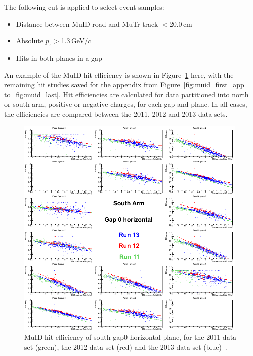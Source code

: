 {\noindent}The following cut is applied to select event samples:
\begin{itemize}
  \item Distance between MuID road and MuTr track $<$20.0\,cm
  \item Absolute $p_{z}$$>$1.3\,GeV/$c$
  \item Hits in both planes in a gap
\end{itemize}

{\noindent}An example of the MuID hit efficiency is shown in
Figure~\ref{fig:muid_first} here, with the remaining hit studies saved for the
appendix from Figure~\ref{fig:muid_first_app} to~\ref{fig:muid_last}. Hit
efficiencies are calculated for data partitioned into north or south arm,
positive or negative charges, for each gap and plane.  In all cases, the
efficiencies are compared between the 2011, 2012 and 2013 data sets.

\begin{center}
  \begin{figure}[p]
    \includegraphics[width=0.99\textwidth]{./figures/efficomp_South_gap0_horizontal.png}
    \caption{
      \label{Fig:efficiency:MuIdEff:a0g0p0}MuID hit efficiency of south gap0
      horizontal plane, for the 2011 data set (green), the 2012 data set (red)
      and the 2013 data set (blue)~\cite{Seidl2014}.
    }
    \label{fig:muid_first}
  \end{figure}
\end{center}

